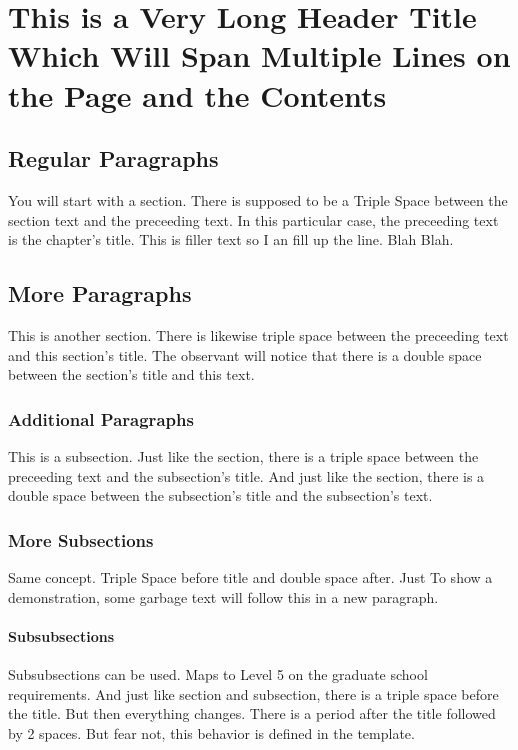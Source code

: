 \chapter{This is a Very Long Header Title Which Will Span Multiple Lines on the Page and the Contents}

\section{Regular Paragraphs}
You will start with a section. 
There is supposed to be a Triple Space between the section text and the preceeding text. 
In this particular case, the preceeding text is the chapter's title. 
This is filler text so I an fill up the line. Blah Blah. 

\section{More Paragraphs}
This is another section. 
There is likewise triple space between the preceeding text and this section's title. 
The observant will notice that there is a double space between the section's title and this text. 

\subsection{Additional Paragraphs}
This is a subsection. 
Just like the section, there is a triple space between the preceeding text and the subsection's title. 
And just like the section, there is a double space between the subsection's title and the subsection's text. 

\subsection{More Subsections}
Same concept. Triple Space before title and double space after. 
Just To show a demonstration, some garbage text will follow this in a new paragraph. 

\lipsum[1]

\subsubsection{Subsubsections}
Subsubsections can be used. Maps to Level 5 on the graduate school requirements. 
And just like section and subsection, there is a triple space before the title. 
But then everything changes. 
There is a period after the title followed by 2 spaces. 
But fear not, this behavior is defined in the template. 


